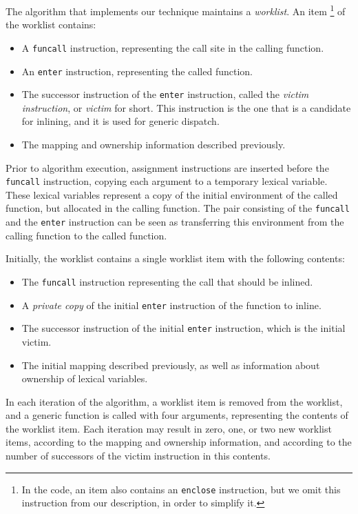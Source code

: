 The algorithm that implements our technique maintains a
\emph{worklist}.  An item%
\footnote{In the code, an item also contains an \texttt{enclose}
  instruction, but we omit this instruction from our description, in
  order to simplify it.}
of the worklist contains:

\begin{itemize}
\item A \texttt{funcall} instruction, representing the call site in the
  calling function.
\item An \texttt{enter} instruction, representing the called function.
\item The successor instruction of the \texttt{enter} instruction,
  called the \emph{victim instruction}, or \emph{victim} for short.
  This instruction is the one that is a candidate for inlining, and it
  is used for generic dispatch.
\item The mapping and ownership information described previously.
\end{itemize}

Prior to algorithm execution, assignment instructions are inserted
before the \texttt{funcall} instruction, copying each argument to a
temporary lexical variable.  These lexical variables represent a copy
of the initial environment of the called function, but allocated in
the calling function.  The pair consisting of the \texttt{funcall} and
the \texttt{enter} instruction can be seen as transferring this
environment from the calling function to the called function.

Initially, the worklist contains a single worklist item with the
following contents:

\begin{itemize}
\item The \texttt{funcall} instruction representing the call that
  should be inlined.
\item A \emph{private copy} of the initial \texttt{enter} instruction
  of the function to inline.
\item The successor instruction of the initial \texttt{enter}
  instruction, which is the initial victim.
\item The initial mapping described previously, as well as
  information about ownership of lexical variables.
\end{itemize}

In each iteration of the algorithm, a worklist item is removed from
the worklist, and a generic function is called with four arguments,
representing the contents of the worklist item.  Each iteration may
result in zero, one, or two new worklist items, according to the
mapping and ownership information, and according to the number of
successors of the victim instruction in this contents.

